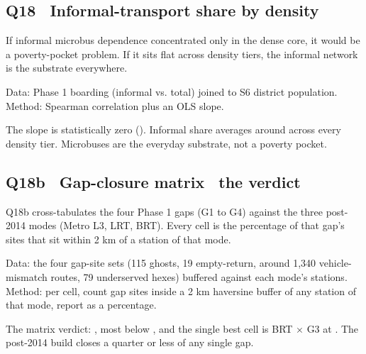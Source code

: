 \subsection{Q18 \textbullet\ Informal-transport share by density}

If informal microbus dependence concentrated only in the dense core,
it would be a poverty-pocket problem. If it sits flat across density
tiers, the informal network is the substrate everywhere.

Data: Phase 1 boarding (informal vs. total) joined to S6 district
population. Method: Spearman correlation plus an OLS slope.


The slope is statistically zero ().
Informal share averages around  across every density tier.
Microbuses are the everyday substrate, not a poverty pocket.

\subsection{Q18b \textbullet\ Gap-closure matrix \textbullet\ the verdict}

Q18b cross-tabulates the four Phase 1 gaps (G1 to G4) against the
three post-2014 modes (Metro L3, LRT, BRT). Every cell is the
percentage of that gap's sites that sit within 2 km of a station of
that mode.

Data: the four gap-site sets (115 ghosts, 19 empty-return, around
1{,}340 vehicle-mismatch routes, 79 underserved hexes) buffered
against each mode's stations. Method: per cell, count gap sites
inside a 2 km haversine buffer of any station of that mode, report
as a percentage.


The matrix verdict: , most below ,
and the single best cell is BRT $\times$ G3 at . The
post-2014 build closes a quarter or less of any single gap.


